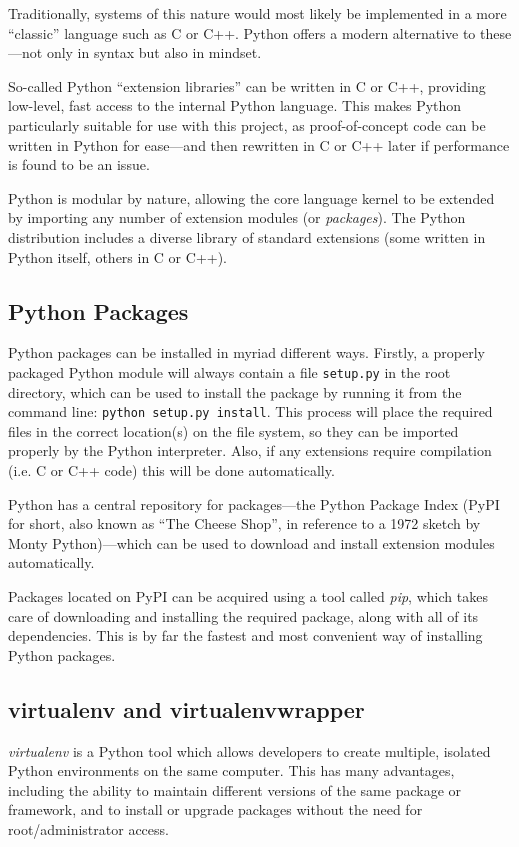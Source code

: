 Traditionally, systems of this nature would most likely be implemented in
a more ``classic'' language such as C or C++. Python offers a modern
alternative to these---not only in syntax but also in mindset.

So-called Python ``extension libraries'' can be written in C or C++, providing
low-level, fast access to the internal Python language. This makes Python
particularly suitable for use with this project, as proof-of-concept code can
be written in Python for ease---and then rewritten in C or C++ later if
performance is found to be an issue.

Python is modular by nature, allowing the core language kernel to be extended
by importing any number of extension modules (or \emph{packages}). The Python
distribution includes a diverse library of standard extensions (some written in
Python itself, others in C or C++).

\subsection{Python Packages}

Python packages can be installed in myriad different ways. Firstly, a properly
packaged Python module will always contain a file \verb!setup.py! in the root
directory, which can be used to install the package by running it from the
command line: \verb!python setup.py install!. This process will place the
required files in the correct location(s) on the file system, so they can be
imported properly by the Python interpreter. Also, if any extensions require
compilation (i.e. C or C++ code) this will be done automatically.

Python has a central repository for packages---the Python Package Index (PyPI
for short, also known as ``The Cheese Shop'', in reference to a 1972 sketch by
Monty Python)---which can be used to download and install extension modules
automatically.

Packages located on PyPI can be acquired using a tool called \emph{pip}, which
takes care of downloading and installing the required package, along with all
of its dependencies. This is by far the fastest and most convenient way of
installing Python packages.

\subsection{virtualenv and virtualenvwrapper}

\emph{virtualenv} is a Python tool which allows developers to create multiple,
isolated Python environments on the same computer. This has many advantages,
including the ability to maintain different versions of the same package or
framework, and to install or upgrade packages without the need for
root/administrator access.

